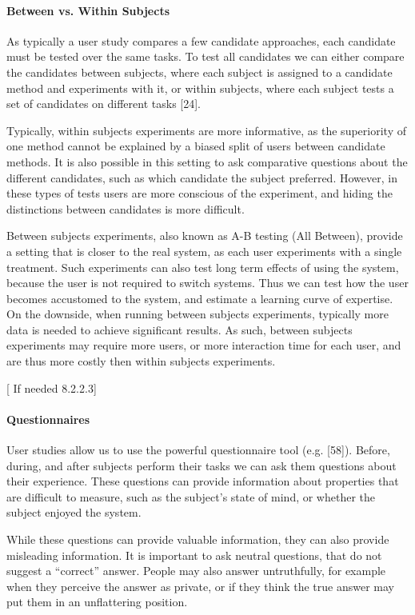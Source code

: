 \paragraph{Between vs. Within Subjects}

As typically a user study compares a few candidate approaches, each candidate must be tested over the same tasks. To test all candidates we can either compare the candidates between subjects, where each subject is assigned to a candidate method and experiments with it, or within subjects, where each subject tests a set of candidates on different tasks [24].

Typically, within subjects experiments are more informative, as the superiority of one method cannot be explained by a biased split of users between candidate methods. It is also possible in this setting to ask comparative questions about the different candidates, such as which candidate the subject preferred. However, in these types of tests users are more conscious of the experiment, and hiding the distinctions between candidates is more difficult.

Between subjects experiments, also known as A-B testing (All Between), provide a setting that is closer to the real system, as each user experiments with a single treatment. Such experiments can also test long term effects of using the system, because the user is not required to switch systems. Thus we can test how the user becomes accustomed to the system, and estimate a learning curve of expertise. On the downside, when running between subjects experiments, typically more data is needed to achieve significant results. As such, between subjects experiments may require more users, or more interaction time for each user, and are thus more costly then within subjects experiments.

[ If needed 8.2.2.3]

\paragraph{Questionnaires}

User studies allow us to use the powerful questionnaire tool (e.g. [58]). Before, during, and after subjects perform their tasks we can ask them questions about their experience. These questions can provide information about properties that are difficult to measure, such as the subject’s state of mind, or whether the subject enjoyed the system.

While these questions can provide valuable information, they can also provide misleading information. It is important to ask neutral questions, that do not suggest a “correct” answer. People may also answer untruthfully, for example when they perceive the answer as private, or if they think the true answer may put them in an unflattering position.

